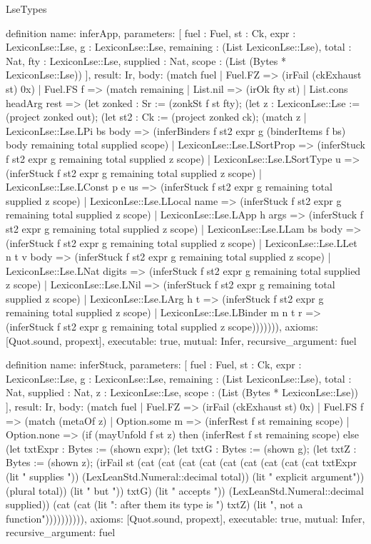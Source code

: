 \begin{lexlean}{LseTypes}
\begin{semanticmodule}
definition{
  name: inferApp,
  parameters: [
    fuel : Fuel,
    st : Ck,
    expr : LexiconLse::Lse,
    g : LexiconLse::Lse,
    remaining : (List LexiconLse::Lse),
    total : Nat,
    fty : LexiconLse::Lse,
    supplied : Nat,
    scope : (List (Bytes * LexiconLse::Lse))
  ],
  result: Ir,
  body: (match fuel
    | Fuel.FZ => (irFail (ckExhaust st) 0x)
    | Fuel.FS f => (match remaining
      | List.nil => (irOk fty st)
      | List.cons headArg rest => (let zonked : Sr := (zonkSt f st fty); (let z : LexiconLse::Lse := (project zonked out); (let st2 : Ck := (project zonked ck); (match z
        | LexiconLse::Lse.LPi bs body => (inferBinders f st2 expr g (binderItems f bs) body remaining total supplied scope)
        | LexiconLse::Lse.LSortProp => (inferStuck f st2 expr g remaining total supplied z scope)
        | LexiconLse::Lse.LSortType u => (inferStuck f st2 expr g remaining total supplied z scope)
        | LexiconLse::Lse.LConst p e us => (inferStuck f st2 expr g remaining total supplied z scope)
        | LexiconLse::Lse.LLocal name => (inferStuck f st2 expr g remaining total supplied z scope)
        | LexiconLse::Lse.LApp h args => (inferStuck f st2 expr g remaining total supplied z scope)
        | LexiconLse::Lse.LLam bs body => (inferStuck f st2 expr g remaining total supplied z scope)
        | LexiconLse::Lse.LLet n t v body => (inferStuck f st2 expr g remaining total supplied z scope)
        | LexiconLse::Lse.LNat digits => (inferStuck f st2 expr g remaining total supplied z scope)
        | LexiconLse::Lse.LNil => (inferStuck f st2 expr g remaining total supplied z scope)
        | LexiconLse::Lse.LArg h t => (inferStuck f st2 expr g remaining total supplied z scope)
        | LexiconLse::Lse.LBinder m n t r => (inferStuck f st2 expr g remaining total supplied z scope))))))),
  axioms: [Quot.sound, propext],
  executable: true,
  mutual: Infer,
  recursive_argument: fuel
}

definition{
  name: inferStuck,
  parameters: [
    fuel : Fuel,
    st : Ck,
    expr : LexiconLse::Lse,
    g : LexiconLse::Lse,
    remaining : (List LexiconLse::Lse),
    total : Nat,
    supplied : Nat,
    z : LexiconLse::Lse,
    scope : (List (Bytes * LexiconLse::Lse))
  ],
  result: Ir,
  body: (match fuel
    | Fuel.FZ => (irFail (ckExhaust st) 0x)
    | Fuel.FS f => (match (metaOf z)
      | Option.some m => (inferRest f st remaining scope)
      | Option.none => (if (mayUnfold f st z) then (inferRest f st remaining scope) else (let txtExpr : Bytes := (shown expr); (let txtG : Bytes := (shown g); (let txtZ : Bytes := (shown z); (irFail st (cat (cat (cat (cat (cat (cat (cat (cat (cat txtExpr (lit " supplies ")) (LexLeanStd.Numeral::decimal total)) (lit " explicit argument")) (plural total)) (lit " but ")) txtG) (lit " accepts ")) (LexLeanStd.Numeral::decimal supplied)) (cat (cat (lit ": after them its type is ") txtZ) (lit ", not a function")))))))))),
  axioms: [Quot.sound, propext],
  executable: true,
  mutual: Infer,
  recursive_argument: fuel
}


\end{semanticmodule}
\end{lexlean}
